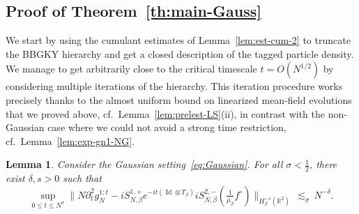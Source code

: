 \documentclass[a4paper,11pt,reqno,noindent]{amsart}
\theoremstyle{plain}
\newtheorem{lem}{Lemma}[section]
\numberwithin{equation}{section}
\newcommand{\R}{\mathbb R}
\newcommand{\Id}{\operatorname{Id}}
\newcommand{\3}{|\!|\!|}
\begin{document}
\subsection{Proof of Theorem~\ref{th:main-Gauss}}
We start by using the cumulant estimates of Lemma~\ref{lem:est-cum-2} to truncate the BBGKY hierarchy and get a closed description of the tagged particle density. We manage to get arbitrarily close to the critical timescale $t=O(N^{1/2})$ by considering multiple iterations of the hierarchy. This iteration procedure works precisely thanks to the almost uniform bound on linearized mean-field evolutions that we proved above, cf.~Lemma~\ref{lem:prelest-LS}(ii), in contrast with the non-Gaussian case where we could not avoid a strong time restriction, cf.~Lemma~\ref{lem:exp-gn1-NG}.

\begin{lem}\label{lem:approx-dt2g1-gaus}
Consider the Gaussian setting~\eqref{eq:Gaussian}.
For all $\sigma<\frac12$, there exist $\delta,s>0$
such that
\begin{equation*}
\sup_{0\le t\le N^\sigma}\Big\|N\partial_t^2g_N^{1;t}-iS_{N,\beta}^{1,+}e^{-it(\Id\otimes T_\beta)}iS_{N,\beta}^{2,-}(\tfrac1{\mu_\beta}f^\circ)\Big\|_{H^{-s}_\beta(\R^2)}\,\lesssim_\sigma\,N^{-\delta}.
\end{equation*}
\end{lem}
\end{document}
